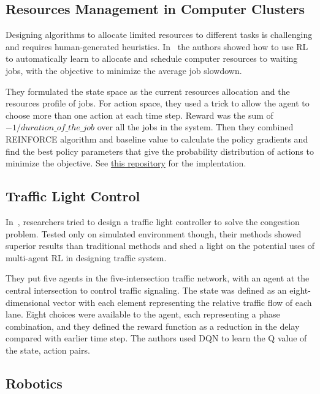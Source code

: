 \documentclass[letterpaper, 10 pt]{IEEEconf}
\begin{document}
\subsection{Resources Management in Computer Clusters}

Designing algorithms to allocate limited resources to different tasks
is challenging and requires human-generated
heuristics. In~\cite{mao2016resource} the authors showed how to use RL
to automatically learn to allocate and schedule computer resources to
waiting jobs, with the objective to minimize the average job slowdown.

They formulated the state space as the current resources allocation
and the resources profile of jobs. For action space, they used a trick
to allow the agent to choose more than one action at each time
step. Reward was the sum of $-1/duration\_of\_the\_job$ over all the
jobs in the system. Then they combined REINFORCE algorithm and
baseline value to calculate the policy gradients and find the best
policy parameters that give the probability distribution of actions to
minimize the objective. See
\href{https://github.com/hongzimao/deeprm}{this repository} for the
implentation.

\subsection{Traffic Light Control}

In~\cite{arel2010reinforcement}, researchers tried to design a traffic
light controller to solve the congestion problem. Tested only on
simulated environment though, their methods showed superior results
than traditional methods and shed a light on the potential uses of
multi-agent RL in designing traffic system.

They put five agents in the five-intersection traffic network, with an
agent at the central intersection to control traffic signaling. The
state was defined as an eight-dimensional vector with each element
representing the relative traffic flow of each lane. Eight choices
were available to the agent, each representing a phase combination,
and they defined the reward function as a reduction in the delay
compared with earlier time step. The authors used DQN to learn the Q
value of the {state, action} pairs.

\subsection{Robotics}
\end{document}
